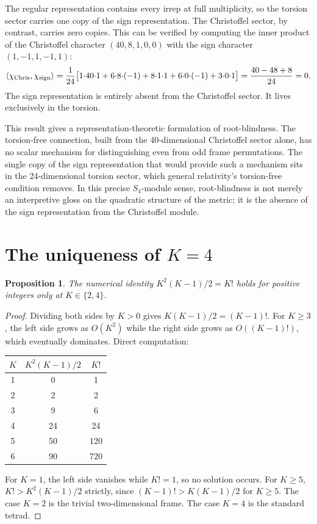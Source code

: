 \documentclass[11pt]{article}
\newtheorem{proposition}[theorem]{Proposition}
\begin{document}
The regular representation contains every irrep at full
multiplicity, so the torsion sector carries one copy of the sign
representation.  The Christoffel sector, by contrast, carries zero
copies.  This can be verified by computing the inner product of the
Christoffel character $(40,8,1,0,0)$ with the sign character
$(1,-1,1,-1,1)$:
\[
        \langle\chi_{\rm Chris},\chi_{\rm sign}\rangle
        =\frac{1}{24}\bigl[
        1{\cdot}40{\cdot}1
        +6{\cdot}8{\cdot}(-1)
        +8{\cdot}1{\cdot}1
        +6{\cdot}0{\cdot}(-1)
        +3{\cdot}0{\cdot}1
        \bigr]
        =\frac{40-48+8}{24}=0.
\]
The sign representation is entirely absent from the Christoffel
sector.  It lives exclusively in the torsion.

This result gives a representation-theoretic formulation of
root-blindness.  The torsion-free connection, built from the
40-dimensional Christoffel sector alone, has no scalar mechanism
for distinguishing even from odd frame permutations.  The single
copy of the sign representation that would provide such a mechanism
sits in the 24-dimensional torsion sector, which general
relativity's torsion-free condition removes.  In this precise $S_4$-module sense, root-blindness is
not merely an interpretive gloss on the quadratic structure of
the metric; it is the absence of the sign representation from the
Christoffel module.


\section{The uniqueness of $K=4$}

\begin{proposition}
The numerical identity $K^2(K-1)/2 = K!$ holds for positive
integers only at $K\in\{2,4\}$.
\end{proposition}

\begin{proof}
Dividing both sides by $K>0$ gives $K(K-1)/2 = (K-1)!$.  For
$K\geq 3$, the left side grows as $O(K^2)$ while the right side
grows as $O((K-1)!)$, which eventually dominates.  Direct
computation:
\begin{center}
\begin{tabular}{ccc}
\toprule
$K$ & $K^2(K-1)/2$ & $K!$ \\
\midrule
1 & 0 & 1 \\
2 & 2 & 2 \\
3 & 9 & 6 \\
4 & 24 & 24 \\
5 & 50 & 120 \\
6 & 90 & 720 \\
\bottomrule
\end{tabular}
\end{center}
For $K=1$, the left side vanishes while $K!=1$, so no solution
occurs.  For $K\geq 5$, $K! > K^2(K-1)/2$ strictly, since
$(K-1)! > K(K-1)/2$ for $K\geq 5$.  The case $K=2$ is the trivial
two-dimensional frame.  The case $K=4$ is the standard tetrad.
\end{proof}
\end{document}
